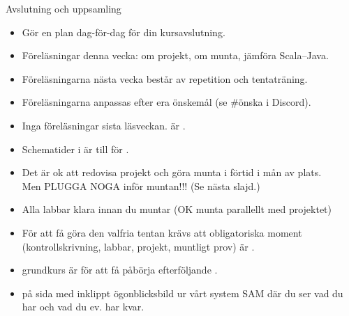 \ifkompendium\else




\begin{SlideExtra}{Avslutning och uppsamling}

\begin{itemize}\SlideFontSmall

\item Gör en  plan dag-för-dag för din kursavslutning.

\item Föreläsningar denna vecka: om projekt, om munta, jämföra Scala--Java.

\item Föreläsningarna nästa vecka består av repetition och tentaträning.

\item Föreläsningarna anpassas efter era önskemål (se \#önska i Discord). %

\item Inga föreläsningar sista läsveckan.  är \LastLectureDate.

\item Schematider i  är till för .

\item Det är ok att redovisa projekt och göra munta i förtid i mån av plats. \\Men PLUGGA NOGA inför muntan!!! (Se nästa slajd.)

\item Alla labbar klara innan du muntar (OK munta parallellt med projektet)

\item För att få göra den valfria tentan krävs att  obligatoriska moment (kontrollskrivning, labbar, projekt, muntligt prov) är . 

\item {} grundkurs är  för att få påbörja efterföljande .

\item {} på sida med inklippt ögonblicksbild ur vårt system SAM där du ser vad du har  och vad du ev. har kvar.

\end{itemize}

\end{SlideExtra}

